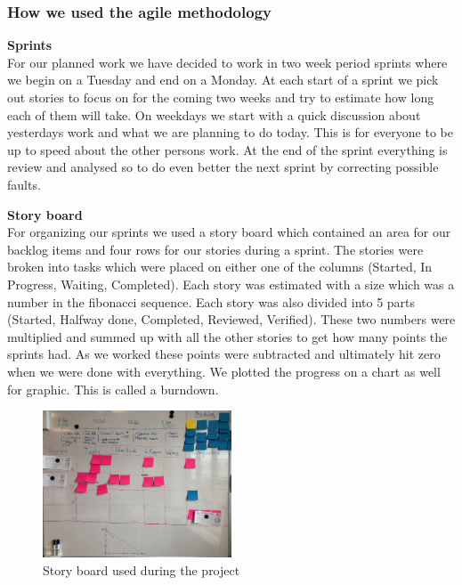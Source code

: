\cite{extremeProgramming}


\subsubsection{How we used the agile methodology}
\textbf{Sprints} \\
For our planned work we have decided to work in two week period sprints where we begin on a Tuesday and end on a Monday. At each start of a sprint we pick out stories to focus on for the coming two weeks and try to estimate how long each of them will take.
On weekdays we start with a quick discussion about yesterdays work and what we are planning to do today. This is for everyone to be up to speed about the other persons work.
At the end of the sprint everything is review and analysed so to do even better the next sprint by correcting possible faults.

\textbf{Story board} \\
For organizing our sprints we used a story board which contained an area for our backlog items and four rows for our stories during a sprint. The stories were broken into tasks which were placed on either one of the columns (Started, In Progress, Waiting, Completed).
Each story was estimated with a size which was a number in the fibonacci sequence. Each story was also divided into 5 parts (Started, Halfway done, Completed, Reviewed, Verified). These two numbers were multiplied and summed up with all the other stories to get how many points the sprints had. As we worked these points were subtracted and ultimately hit zero when we were done with everything. We plotted the progress on a chart as well for graphic. This is called a burndown.

\begin{figure}[hbtp]
\begin{center}
\includegraphics[width = 0.5\textwidth]{./Images/story_board.jpg} 
\caption{Story board used during the project}
\end{center}
\end{figure}


